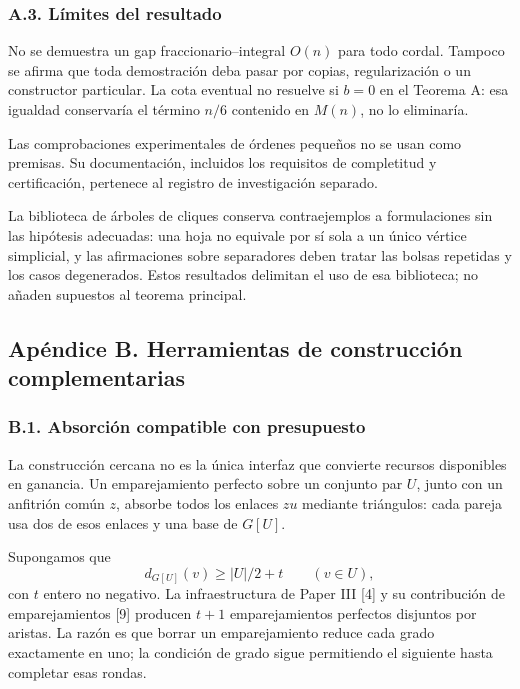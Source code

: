 \documentclass[spanish,11pt,a4paper]{article}
\begin{document}
\subsubsection{A.3. Límites del resultado}\label{a.3.-luxedmites-del-resultado}

No se demuestra un gap fraccionario--integral \(O(n)\) para todo cordal. Tampoco se afirma que toda demostración deba pasar por copias, regularización o un constructor particular. La cota eventual no resuelve si \(b=0\) en el Teorema A: esa igualdad conservaría el término \(n/6\) contenido en \(M(n)\), no lo eliminaría.

Las comprobaciones experimentales de órdenes pequeños no se usan como premisas. Su documentación, incluidos los requisitos de completitud y certificación, pertenece al registro de investigación separado.

La biblioteca de árboles de cliques conserva contraejemplos a formulaciones sin las hipótesis adecuadas: una hoja no equivale por sí sola a un único vértice simplicial, y las afirmaciones sobre separadores deben tratar las bolsas repetidas y los casos degenerados. Estos resultados delimitan el uso de esa biblioteca; no añaden supuestos al teorema principal.

\subsection{Apéndice B. Herramientas de construcción complementarias}\label{apuxe9ndice-b.-herramientas-de-construcciuxf3n-complementarias}

\subsubsection{B.1. Absorción compatible con presupuesto}\label{b.1.-absorciuxf3n-compatible-con-presupuesto}

La construcción cercana no es la única interfaz que convierte recursos disponibles en ganancia. Un emparejamiento perfecto sobre un conjunto par \(U\), junto con un anfitrión común \(z\), absorbe todos los enlaces \(zu\) mediante triángulos: cada pareja usa dos de esos enlaces y una base de \(G[U]\).

Supongamos que \[
d_{G[U]}(v)\ge |U|/2+t\qquad(v\in U),
\tag{B.1}
\] con \(t\) entero no negativo. La infraestructura de Paper III {[}4{]} y su contribución de emparejamientos {[}9{]} producen \(t+1\) emparejamientos perfectos disjuntos por aristas. La razón es que borrar un emparejamiento reduce cada grado exactamente en uno; la condición de grado sigue permitiendo el siguiente hasta completar esas rondas.
\end{document}
